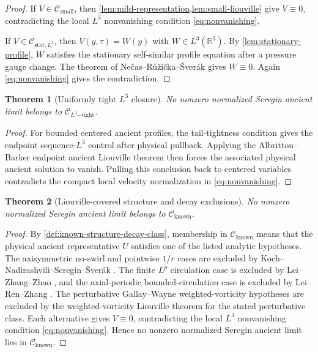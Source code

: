 \documentclass[11pt]{amsart}
\theoremstyle{plain}
\newtheorem{theorem}{Theorem}[section]
\theoremstyle{definition}
\theoremstyle{remark}
\numberwithin{equation}{section}
\newcommand{\R}{\mathbb R}
\newcommand{\calC}{\mathcal C}
\begin{document}
\begin{proof}
If \(V\in\calC_{\mathrm{small}}\), then
\cref{lem:mild-representation,lem:small-liouville} give \(V\equiv0\),
contradicting the local \(L^3\) nonvanishing condition
\eqref{eq:nonvanishing}.

If \(V\in\calC_{\mathrm{stat},L^3}\), then
\(V(y,\tau)=W(y)\) with \(W\in L^3(\R^3)\).  By
\cref{lem:stationary-profile}, \(W\) satisfies the stationary self-similar
profile equation after a pressure gauge change.
The theorem of Ne\v{c}as--R\r{u}\v{z}i\v{c}ka--\v{S}ver\'ak
\cite{NRS1996} gives \(W\equiv0\).  Again
\eqref{eq:nonvanishing} gives the contradiction.
\end{proof}

\begin{theorem}[Uniformly tight \(L^3\) closure]
\label{hyp:tight-liouville}
No nonzero normalized Seregin ancient limit belongs to
\(\calC_{L^3\mathrm{-tight}}\).
\end{theorem}

\begin{proof}
For bounded centered ancient profiles, the tail-tightness condition gives the
endpoint sequence-\(L^3\) control after physical pullback.  Applying the
Albritton--Barker endpoint ancient Liouville theorem then forces the associated
physical ancient solution to vanish.  Pulling this conclusion back to centered
variables contradicts the compact local velocity normalization in
\eqref{eq:nonvanishing}.
\end{proof}

\begin{theorem}[Liouville-covered structure and decay exclusions]
\label{thm:known-structure-decay-liouville}
No nonzero normalized Seregin ancient limit belongs to
\(\calC_{\mathrm{known}}\).
\end{theorem}

\begin{proof}
By \cref{def:known-structure-decay-class}, membership in
\(\calC_{\mathrm{known}}\) means that the physical ancient representative
\(U\) satisfies one of the listed analytic hypotheses.  The axisymmetric
no-swirl and pointwise \(1/r\) cases are excluded by
Koch--Nadirashvili--Seregin--\v{S}ver\'ak \cite{KNSS2009}.  The finite
\(L^p\) circulation case is excluded by Lei--Zhang--Zhao \cite{LZZ2017}, and
the axial-periodic bounded-circulation case is excluded by Lei--Ren--Zhang
  \cite{LRZ2022}.  The perturbative Gallay--Wayne weighted-vorticity hypotheses
  are excluded by the weighted-vorticity Liouville theorem for the stated
  perturbative class.  Each
alternative gives \(V\equiv0\), contradicting the local \(L^3\) nonvanishing
condition \eqref{eq:nonvanishing}.  Hence no nonzero normalized Seregin
ancient limit lies in \(\calC_{\mathrm{known}}\).
\end{proof}
\end{document}
